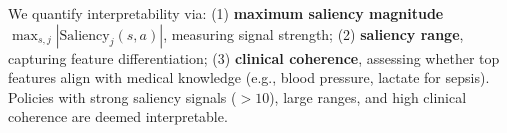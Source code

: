 We quantify interpretability via: (1) \textbf{maximum saliency magnitude} $\max_{s, j} |\text{Saliency}_j(s, a)|$, measuring signal strength; (2) \textbf{saliency range}, capturing feature differentiation; (3) \textbf{clinical coherence}, assessing whether top features align with medical knowledge (e.g., blood pressure, lactate for sepsis). Policies with strong saliency signals ($>10$), large ranges, and high clinical coherence are deemed interpretable.

